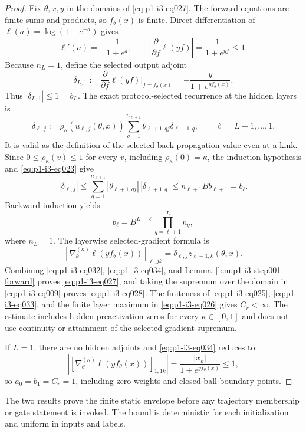 \begin{proof}
Fix $\theta,x,y$ in the domains of \eqref{eq:p1-i3-eq027}.  The forward equations are finite
sums and products, so $f_\theta(x)$ is finite.  Direct differentiation of
$\ell(a)=\log(1+e^{-a})$ gives
\[
\ell'(a)=-\frac1{1+e^a},
\qquad
\left|\frac{\partial}{\partial f}\ell(yf)\right|
=\frac1{1+e^{yf}}\leq1.
\tag{29}\label{eq:p1-i3-eq029}
\]
Because $n_L=1$, define the selected output adjoint
\[
\delta_{L,1}:=\frac{\partial}{\partial f}\ell(yf)\bigg|_{f=f_\theta(x)}
=-\frac{y}{1+e^{yf_\theta(x)}}.
\tag{30}\label{eq:p1-i3-eq030}
\]
Thus $|\delta_{L,1}|\leq1=b_L$.  The exact protocol-selected recurrence at
the hidden layers is
\[
\delta_{\ell,j}:=\rho_\kappa(u_{\ell,j}(\theta,x))
\sum_{q=1}^{n_{\ell+1}}
\theta_{\ell+1,qj}\delta_{\ell+1,q},
\qquad \ell=L-1,\ldots,1.
\tag{31}\label{eq:p1-i3-eq031}
\]
It is valid as the definition of the selected back-propagation value even at
a kink.  Since $0\leq\rho_\kappa(v)\leq1$ for every $v$, including
$\rho_\kappa(0)=\kappa$, the induction hypothesis and \eqref{eq:p1-i3-eq023} give
\[
|\delta_{\ell,j}|
\leq\sum_{q=1}^{n_{\ell+1}}
|\theta_{\ell+1,qj}|\,|\delta_{\ell+1,q}|
\leq n_{\ell+1}B b_{\ell+1}=b_\ell.
\tag{32}\label{eq:p1-i3-eq032}
\]
Backward induction yields
\[
b_\ell=B^{L-\ell}\prod_{q=\ell+1}^{L}n_q,
\tag{33}\label{eq:p1-i3-eq033}
\]
where $n_L=1$.  The layerwise selected-gradient formula is
\[
[\nabla_\theta^{(\kappa)}\ell(yf_\theta(x))]_{\ell,jk}
=\delta_{\ell,j}z_{\ell-1,k}(\theta,x).
\tag{34}\label{eq:p1-i3-eq034}
\]
Combining \eqref{eq:p1-i3-eq032}, \eqref{eq:p1-i3-eq034}, and Lemma~\ref{lem:p1-i3-step001-forward} proves
\eqref{eq:p1-i3-eq027}, and taking the supremum over the domain in \eqref{eq:p1-i3-eq009} proves \eqref{eq:p1-i3-eq028}.  The
finiteness of \eqref{eq:p1-i3-eq025}, \eqref{eq:p1-i3-eq033}, and the finite layer maximum in \eqref{eq:p1-i3-eq026} gives
$C_r<\infty$.  The estimate includes hidden preactivation zeros for every
$\kappa\in[0,1]$ and does not use continuity or attainment of the selected
gradient supremum.

If $L=1$, there are no hidden adjoints and \eqref{eq:p1-i3-eq034} reduces to
\[
\left|[\nabla_\theta^{(\kappa)}\ell(yf_\theta(x))]_{1,1k}\right|
=\frac{|x_k|}{1+e^{yf_\theta(x)}}\leq1,
\tag{35}\label{eq:p1-i3-eq035}
\]
so $a_0=b_1=C_r=1$, including zero weights and closed-ball boundary points.
\end{proof}

The two results prove the finite static envelope before any trajectory
membership or gate statement is invoked.  The bound is deterministic for each
initialization and uniform in inputs and labels.

